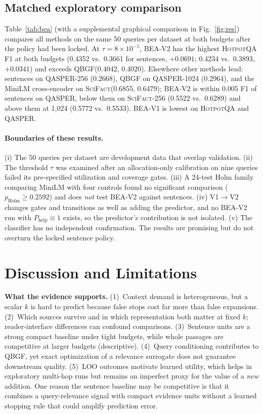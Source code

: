 \documentclass[10pt,twocolumn,letterpaper]{article}
\newcommand{\qbgf}{\textsc{QBGF}\xspace}
\newcommand{\vone}{\textsc{BEA-V1}\xspace}
\newcommand{\vtwo}{\textsc{BEA-V2}\xspace}
\newcommand{\hotpot}{\textsc{HotpotQA}\xspace}
\newcommand{\qasper}{\textsc{QASPER}\xspace}
\newcommand{\scifact}{\textsc{SciFact}\xspace}
\newcommand{\Phelp}{P_{\mathrm{help}}}
\begin{document}
\subsection{Matched exploratory comparison}
Table~\ref{tab:bea} (with a supplemental graphical comparison in Fig.~\ref{fig:res}) compares all methods on the same 50 queries per dataset at both budgets after the policy had been locked. At $\tau{=}8{\times}10^{-5}$, \vtwo has the highest \hotpot F1 at both budgets (0.4352 vs.\ 0.3661 for sentences, $+0.0691$; 0.4234 vs.\ 0.3893, $+0.0341$) and exceeds \qbgf (0.4042, 0.4020). Elsewhere other methods lead: sentences on \qasper-256 (0.2668), \qbgf on \qasper-1024 (0.2964), and the MiniLM cross-encoder on \scifact (0.6855, 0.6479); \vtwo is within 0.005 F1 of sentences on \qasper, below them on \scifact-256 (0.5522 vs.\ 0.6289) and above them at 1,024 (0.5772 vs.\ 0.5533). \vone is lowest on \hotpot and \qasper.





\paragraph{Boundaries of these results.} (i) The 50 queries per dataset are development data that overlap validation. (ii) The threshold $\tau$ was examined after an allocation-only calibration on nine queries failed its pre-specified utilization and coverage gates. (iii) A 24-test Holm family comparing MiniLM with four controls found no significant comparison ($p_{\mathrm{Holm}}\ge0.2592$) and does \emph{not} test \vtwo against sentences. (iv) V1$\to$V2 changes gates and transitions as well as adding the predictor, and no \vtwo run with $\Phelp\equiv1$ exists, so the predictor's contribution is not isolated. (v) The classifier has no independent confirmation. The results are promising but do not overturn the locked sentence policy.

\section{Discussion and Limitations}\label{sec:disc}
\textbf{What the evidence supports.} (1)~Context demand is heterogeneous, but a scalar $k$ is hard to predict because false stops cost far more than false expansions. (2)~Which sources survive and in which representation both matter at fixed $k$; reader-interface differences can confound comparisons. (3)~Sentence units are a strong compact baseline under tight budgets, while whole passages are competitive at larger budgets (descriptive). (4)~Query conditioning contributes to QBGF, yet exact optimization of a relevance surrogate does not guarantee downstream quality. (5)~LOO outcomes motivate learned utility, which helps in exploratory multi-hop runs but remains an imperfect proxy for the value of a \emph{new} addition. One reason the sentence baseline may be competitive is that it combines a query-relevance signal with compact evidence units without a learned stopping rule that could amplify prediction error.
\end{document}
